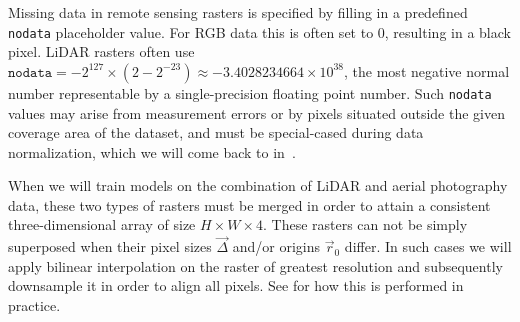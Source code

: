 Missing data in remote sensing rasters is specified by filling in a predefined \texttt{nodata} placeholder value.
For RGB data this is often set to $0$, resulting in a black pixel.
LiDAR rasters often use $\texttt{nodata} = -2^{127} \times (2 - 2^{-23}) \approx -3.4028234664 \times 10^{38}$, the most negative normal number representable by a single-precision floating point number.
Such \texttt{nodata} values may arise from measurement errors or by pixels situated outside the given coverage area of the dataset, and must be special-cased during data normalization, which we will come back to in~.

When we will train models on the combination of LiDAR and aerial photography data, these two types of rasters must be merged in order to attain a consistent three-dimensional array of size $H \times W \times 4$.
These rasters can not be simply superposed when their pixel sizes $\vec{\Delta}$ and/or origins $\vec{r}_0$ differ.
In such cases we will apply bilinear interpolation on the raster of greatest resolution and subsequently downsample it in order to align all pixels.
See  for how this is performed in practice.
